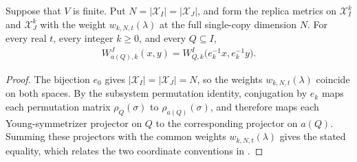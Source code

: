 \begin{lemma}
    \label{thm:al_augmented_replica_metric_coordinates}
    \leanok
    Suppose that $V$ is finite. Put
    $N=|\mathcal X_I|=|\mathcal X_J|$, and form the replica metrics on
    $\mathcal X_I^k$ and $\mathcal X_J^k$ with the weight
    $w_{k,N,t}(\lambda)$ at the full single-copy dimension $N$.
    For every real $t$, every integer $k\ge0$, and every $Q\subseteq I$,
    \begin{align*}
        W^{J}_{a(Q),k}(x,y)=W^{I}_{Q,k}\bigl(e_k^{-1}x,e_k^{-1}y\bigr).
    \end{align*}
\end{lemma}
\begin{proof}\leanok
    The bijection $e_0$ gives $|\mathcal X_I|=|\mathcal X_J|=N$, so the
    weights $w_{k,N,t}(\lambda)$ coincide on both spaces. By the subsystem
    permutation identity, conjugation by $e_k$
    maps each permutation matrix $\rho_Q(\sigma)$ to
    $\rho_{a(Q)}(\sigma)$, and therefore maps each Young-symmetrizer
    projector on $Q$ to the corresponding projector on $a(Q)$. Summing
    these projectors with the common weights $w_{k,N,t}(\lambda)$ gives
    the stated equality, which relates the two coordinate conventions in
    \cite[Sections~5--8]{OpenAI2026AreaLaw}.
\end{proof}
